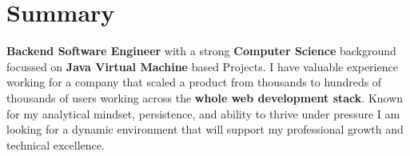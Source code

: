 \documentclass{style/modernsimplecv}
\begin{document}
\subsection*{}
\vspace{-3em}
\begin{minipage}{0.99\textwidth}
\section*{Summary}
    \textbf{Backend Software Engineer} with a strong \textbf{Computer Science} background focussed on \textbf{Java Virtual Machine} based Projects. I have valuable experience working for a company that scaled a product from thousands to hundreds of thousands of users working across the \textbf{whole web development stack}. Known for my analytical mindset, persistence, and ability to thrive under pressure I am looking for a dynamic environment that will support my professional growth and technical excellence.
\end{minipage}
\bigskip
\end{document}
